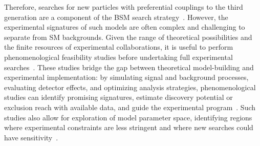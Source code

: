 Therefore, searches for new particles with preferential couplings to the third generation are a component of the BSM search strategy~\cite{CMS:2020wzx,ATLAS:2019qpq}. However, the experimental signatures of such models are often complex and challenging to separate from SM backgrounds. Given the range of theoretical possibilities and the finite resources of experimental collaborations, it is useful to perform phenomenological feasibility studies before undertaking full experimental searches~\cite{Faroughy:2016osc,Baker:2019sli}. These studies bridge the gap between theoretical model-building and experimental implementation: by simulating signal and background processes, evaluating detector effects, and optimizing analysis strategies, phenomenological studies can identify promising signatures, estimate discovery potential or exclusion reach with available data, and guide the experimental program~\cite{Cowan:2011}. Such studies also allow for exploration of model parameter space, identifying regions where experimental constraints are less stringent and where new searches could have sensitivity~\cite{Dorsner:2016wpm}.
